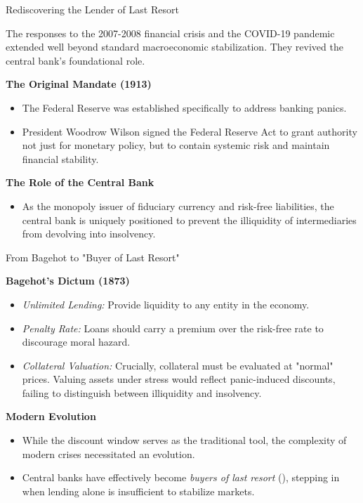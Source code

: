 \documentclass[11pt,aspectratio=169]{beamer}
\begin{document}
\begin{frame}{Rediscovering the Lender of Last Resort}
\small

The responses to the 2007-2008 financial crisis and the COVID-19 pandemic extended well beyond standard macroeconomic stabilization. They revived the central bank's foundational role.

\vspace{0.4cm}

\textbf{The Original Mandate (1913)}
\begin{itemize}
    \item The Federal Reserve was established specifically to address banking panics.
    \item President Woodrow Wilson signed the Federal Reserve Act to grant authority not just for monetary policy, but to contain systemic risk and maintain financial stability.
\end{itemize}

\vspace{0.4cm}

\textbf{The Role of the Central Bank }
\begin{itemize}
    \item As the monopoly issuer of fiduciary currency and risk-free liabilities, the central bank  is uniquely positioned to prevent the illiquidity of intermediaries from devolving into insolvency.
\end{itemize}

\end{frame}

\begin{frame}{From Bagehot to "Buyer of Last Resort"}
\small

\textbf{Bagehot's Dictum (1873)}
\begin{itemize}
    \item \textit{Unlimited Lending:} Provide liquidity to any entity in the economy.
    \item \textit{Penalty Rate:} Loans should carry a premium over the risk-free rate to discourage moral hazard.
    \item \textit{Collateral Valuation:} Crucially, collateral must be evaluated at "normal" prices. Valuing assets under stress would reflect panic-induced discounts, failing to distinguish between illiquidity and insolvency.
\end{itemize}

\vspace{0.4cm}

\textbf{Modern Evolution}
\begin{itemize}
    \item While the discount window serves as the traditional tool, the complexity of modern crises necessitated an evolution.
    \item Central banks have effectively become \textit{buyers of last resort} (\cite{bernanke2022}), stepping in when lending alone is insufficient to stabilize markets.
\end{itemize}

\end{frame}
\end{document}
